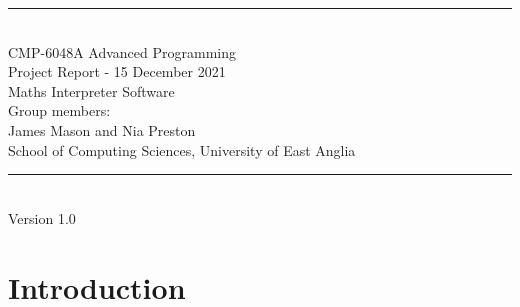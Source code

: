 \documentclass[a4paper, oneside, 11pt]{report}
\begin{document}
\begin{titlepage}
\begin{center}
\rule{12cm}{1mm} \\
\vspace{1cm}
{\large  CMP-6048A Advanced Programming}
\vspace{7.5cm}
\\{\Large Project Report - 15 December 2021}
\vspace{1.5cm}
\\{\LARGE Maths Interpreter Software}
\vspace{1.0cm}
\\{\Large Group members: \\ James Mason and Nia Preston}
\vspace{10.0cm}
\\{\large School of Computing Sciences, University of East Anglia}
\\ \rule{12cm}{0.5mm}
\\ \hspace{8.5cm} {\large Version 1.0}
\end{center}
\end{titlepage}


\setcounter{page}{1}


\begin{abstract}
In this project, our aim was to create a maths-based interpreter, capable of a range of useful mathematical operations outlined by the project brief.
This includes expression evaluation and function graphing via abstract syntax tree based interpretation. The abstract syntax tree allows the correct precedence when interpreting based on the depth of the node in the tree. Each node within the tree, implements a visitor pattern allowing further abstraction and generalization within the interpreter. We used a scrum based development methodology to develop our language in sprints, allowing us to evolve our program over time with frequent re-adjustment of requirements and functionality.


At the conclusion of our project, we found that we were able to implement all "Must" criteria alongside most of our "Should" criteria.
Our program is built in a way that it can be easily extended, but is a stable and practical program in its current state.
\end{abstract}

\chapter{Introduction}
\label{chap:intro}
\end{document}
